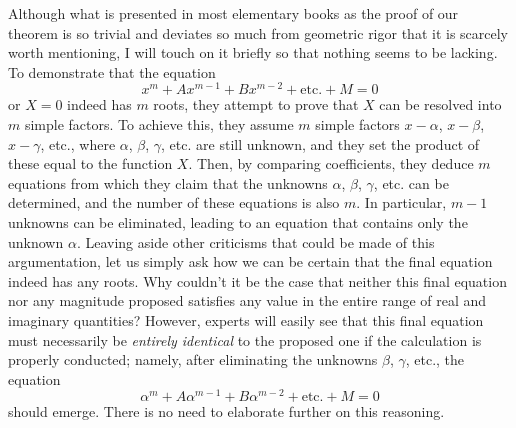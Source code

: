 \documentclass[12pt]{memoir}
\theoremstyle{plain}
\theoremstyle{remark}
\begin{document}
Although what is presented in most elementary books as the proof of our theorem is so trivial and deviates so much from geometric rigor that it is scarcely worth mentioning, I will touch on it briefly so that nothing seems to be lacking. To demonstrate that the equation \[x^m + Ax^{m-1} + Bx^{m-2} + \text{etc.} + M = 0\] or \(X = 0\) indeed has \(m\) roots, they attempt to prove that \(X\) can be resolved into \(m\) simple factors. To achieve this, they assume \(m\) simple factors \(x-\alpha\), \(x-\beta\), \(x-\gamma\), etc., where \(\alpha\), \(\beta\), \(\gamma\), etc. are still unknown, and they set the product of these equal to the function \(X\). Then, by comparing coefficients, they deduce \(m\) equations from which they claim that the unknowns \(\alpha\), \(\beta\), \(\gamma\), etc. can be determined, and the number of these equations is also \(m\). In particular, \(m-1\) unknowns can be eliminated, leading to an equation that contains only the unknown \(\alpha\). Leaving aside other criticisms that could be made of this argumentation, let us simply ask how we can be certain that the final equation indeed has any roots.  Why couldn't it be the case that neither this final equation nor any magnitude proposed satisfies any value in the entire range of real and imaginary quantities?  However, experts will easily see that this final equation must necessarily be \textit{entirely identical} to the proposed one if the calculation is properly conducted; namely, after eliminating the unknowns \(\beta\), \(\gamma\), etc., the equation \[\alpha^m + A\alpha^{m-1} + B\alpha^{m-2} + \text{etc.} + M = 0\] should emerge. There is no need to elaborate further on this reasoning.
\end{document}
